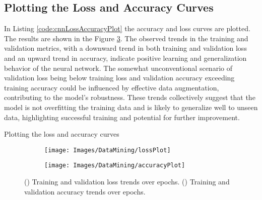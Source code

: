 \subsection{Plotting the Loss and Accuracy Curves}

In Listing \ref{code:cnnLossAccuracyPlot} the accuracy and loss curves are plotted. The results are shown in the Figure \ref{fig:AccuracyandLoss}. The observed trends in the training and validation metrics, with a downward trend in both training and validation loss and an upward trend in accuracy, indicate positive learning and generalization behavior of the neural network. The somewhat unconventional scenario of validation loss being below training loss and validation accuracy exceeding training accuracy could be influenced by effective data augmentation, contributing to the model's robustness. These trends collectively suggest that the model is not overfitting the training data and is likely to generalize well to unseen data, highlighting successful training and potential for further improvement.

\begin{code}[h!]
	    
	
	\caption{Plotting the loss and accuracy curves}
	\label{code:cnnLossAccuracyPlot}
\end{code}

\begin{figure}[h!]
	\centering
	
	\begin{subfigure}{0.45\textwidth}
		\texttt{[image: Images/DataMining/lossPlot]}
		\caption{}    %
		\label{subfig:lossTrends}
	\end{subfigure}
	\hfill
	\begin{subfigure}{0.45\textwidth}
		\texttt{[image: Images/DataMining/accuracyPlot]}
		\caption{}    %
		\label{subfig:accuracyTrends}
	\end{subfigure}
	
	\caption{() Training and validation loss trends over epochs. () Training and validation accuracy trends over epochs.}
	\label{fig:AccuracyandLoss}
\end{figure}

